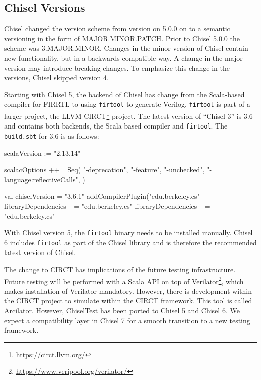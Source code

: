 \documentclass[%
    10pt,
    headinclude, footexclude,
    openright, %
    notitlepage,
    cleardoubleempty,
    headsepline,
    pointlessnumbers,
    bibtotoc, idxtotoc,
    ]{scrbook}
\newcommand{\code}[1]{{\lstinline[basicstyle=\small\ttfamily]{#1}}}
\newcommand{\myref}[2]{\href{#1}{#2}}
\renewcommand{\myref}[2]{{#2}{\footnote{\url{#1}}}}
\begin{document}
\subsection{Chisel Versions}


Chisel changed the version scheme from version on 5.0.0 on to a semantic versioning in the
form of MAJOR.MINOR.PATCH. Prior to Chisel 5.0.0 the scheme was 3.MAJOR.MINOR.
Changes in the minor version of Chisel contain new functionality, but in a backwards compatible way.
A change in the major version may introduce breaking changes.
To emphasize this change in the versions, Chisel skipped version 4.

Starting with Chisel 5, the backend of Chisel has change from the Scala-based compiler for FIRRTL
to using \code{firtool} to generate Verilog. \code{firtool} is part of a larger project,
the \myref{https://circt.llvm.org/}{LLVM CIRCT} project.
The latest version of ``Chisel 3'' is 3.6 and contains both backends, the Scala based 
compiler and \code{firtool}.
The \code{build.sbt} for 3.6 is as follows:

\begin{chisel}
scalaVersion := "2.13.14"

scalacOptions ++= Seq(
  "-deprecation",
  "-feature",
  "-unchecked",
  "-language:reflectiveCalls",
)

val chiselVersion = "3.6.1"
addCompilerPlugin("edu.berkeley.cs" %
libraryDependencies += "edu.berkeley.cs" %
libraryDependencies += "edu.berkeley.cs" %
\end{chisel}

With Chisel version 5, the \code{firtool} binary needs to be installed manually.
Chisel 6 includes \code{firtool} as part of the Chisel library and is therefore the recommended
latest version of Chisel.

The change to CIRCT has implications of the future testing infrastructure.
Future testing will be performed with a Scala API on top of
\myref{https://www.veripool.org/verilator/}{Verilator}, which makes installation of
Verilator mandatory. However, there is development within the CIRCT project
to simulate within the CIRCT framework. This tool is called Arcilator.
However, ChiselTest has been ported to Chisel 5 and Chisel 6.
We expect a compatibility layer in Chisel 7 for a smooth transition to a new
testing framework.
\end{document}
